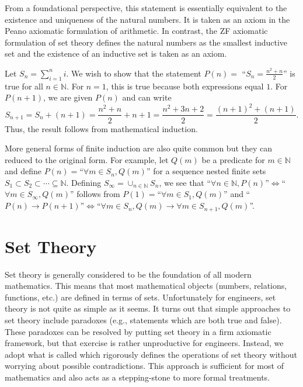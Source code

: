 From a foundational perspective, this statement is essentially equivalent to the existence and uniqueness of the natural numbers.
It is taken as an axiom in the Peano axiomatic formulation of arithmetic.
In contrast, the ZF axiomatic formulation of set theory defines the natural numbers as the smallest inductive set and the existence of an inductive set is taken as an axiom.

\begin{example}
Let $S_n = \sum_{i=1}^n i$.
We wish to show that the statement $P(n)=$ ``$S_n = \frac{n^2 + n}{2}$'' is true for all $n\in \mathbb{N}$.
For $n=1$, this is true because both expressions equal $1$.
For $P(n+1)$, we are given $P(n)$ and can write
\[ S_{n+1} = S_n + (n+1) = \frac{n^2 + n}{2} + n+1 = \frac{n^2 + 3n + 2}{2} = \frac{(n+1)^2+(n+1)}{2}. \]
Thus, the result follows from mathematical induction.
\end{example}

More general forms of finite induction are also quite common but they can reduced to the original form.
For example, let $Q(m)$ be a predicate for $m\in \mathbb{N}$ and define $P(n) =$``$\forall m\in S_n, Q(m)$'' for a sequence nested finite sets $S_1 \subset S_2 \subset \cdots \subseteq \mathbb{N}$.
Defining $S_\infty = \cup_{n\in \mathbb{N}} S_n$, we see that ``$\forall n\in\mathbb{N}, P(n)$''$\Leftrightarrow$``$\forall m\in S_\infty, Q(m)$'' follows from $P(1)=$``$\forall m\in S_1, Q(m)$'' and ``$P(n)\to P(n+1)$''$\Leftrightarrow$``$\forall m\in S_n, Q(m) \rightarrow \forall {m} \in S_{n+1}, Q(m)$''.

\newpage
\section{Set Theory}
Set theory is generally considered to be the foundation of all modern mathematics.
This means that most mathematical objects (numbers, relations, functions, etc.) are defined in terms of sets.
Unfortunately for engineers, set theory is not quite as simple as it seems.
It turns out that simple approaches to set theory include paradoxes (e.g., statements which are both true and false).
These paradoxes can be resolved by putting set theory in a firm axiomatic framework, but that exercise is rather unproductive for engineers.
Instead, we adopt what is called  which rigorously defines the operations of set theory without worrying about possible contradictions.
This approach is sufficient for most of mathematics and also acts as a stepping-stone to more formal treatments.

